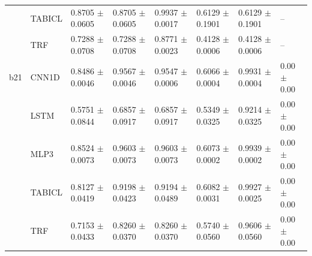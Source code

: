 \begin{tabular}{ll lll ll l}
 & TABICL & 0.8705 $\pm$ 0.0605 & 0.8705 $\pm$ 0.0605 & 0.9937 $\pm$ 0.0017 & 0.6129 $\pm$ 0.1901 & 0.6129 $\pm$ 0.1901 & --\\
 & TRF & 0.7288 $\pm$ 0.0708 & 0.7288 $\pm$ 0.0708 & 0.8771 $\pm$ 0.0023 & 0.4128 $\pm$ 0.0006 & 0.4128 $\pm$ 0.0006 & --\\
\midrule
b21 & CNN1D & 0.8486 $\pm$ 0.0046 & 0.9567 $\pm$ 0.0046 & 0.9547 $\pm$ 0.0006 & 0.6066 $\pm$ 0.0004 & 0.9931 $\pm$ 0.0004 & 0.00 $\pm$ 0.00\\
 & LSTM & 0.5751 $\pm$ 0.0844 & 0.6857 $\pm$ 0.0917 & 0.6857 $\pm$ 0.0917 & 0.5349 $\pm$ 0.0325 & 0.9214 $\pm$ 0.0325 & 0.00 $\pm$ 0.00\\
 & MLP3 & 0.8524 $\pm$ 0.0073 & 0.9603 $\pm$ 0.0073 & 0.9603 $\pm$ 0.0073 & 0.6073 $\pm$ 0.0002 & 0.9939 $\pm$ 0.0002 & 0.00 $\pm$ 0.00\\
 & TABICL & 0.8127 $\pm$ 0.0419 & 0.9198 $\pm$ 0.0423 & 0.9194 $\pm$ 0.0489 & 0.6082 $\pm$ 0.0031 & 0.9927 $\pm$ 0.0025 & 0.00 $\pm$ 0.00\\
 & TRF & 0.7153 $\pm$ 0.0433 & 0.8260 $\pm$ 0.0370 & 0.8260 $\pm$ 0.0370 & 0.5740 $\pm$ 0.0560 & 0.9606 $\pm$ 0.0560 & 0.00 $\pm$ 0.00\\
\bottomrule
\end{tabular}
